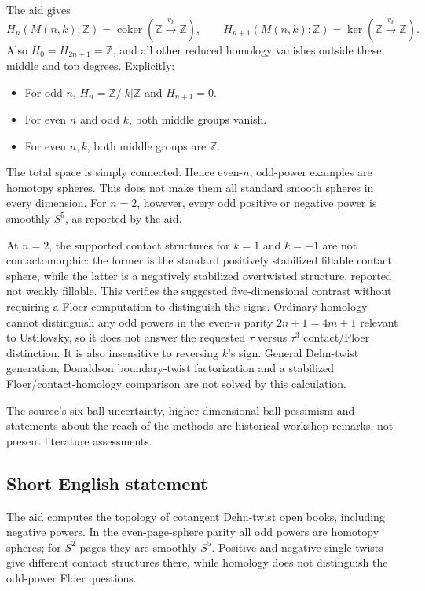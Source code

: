 \documentclass[11pt]{article}
\newcommand{\Z}{\mathbb{Z}}
\begin{document}
The aid gives
\[
 H_n(M(n,k);\Z)=\operatorname{coker}(\Z\xrightarrow{v_k}\Z),
 \qquad
 H_{n+1}(M(n,k);\Z)=\ker(\Z\xrightarrow{v_k}\Z).
\]
Also \(H_0=H_{2n+1}=\Z\), and all other reduced homology vanishes outside these middle and top degrees. Explicitly:
\begin{itemize}
\item For odd \(n\), \(H_n=\Z/|k|\Z\) and \(H_{n+1}=0\).
\item For even \(n\) and odd \(k\), both middle groups vanish.
\item For even \(n,k\), both middle groups are \(\Z\).
\end{itemize}
The total space is simply connected. Hence even-\(n\), odd-power examples are homotopy spheres. This does not make them all standard smooth spheres in every dimension. For \(n=2\), however, every odd positive or negative power is smoothly \(S^5\), as reported by the aid.

At \(n=2\), the supported contact structures for \(k=1\) and \(k=-1\) are not contactomorphic: the former is the standard positively stabilized fillable contact sphere, while the latter is a negatively stabilized overtwisted structure, reported not weakly fillable. This verifies the suggested five-dimensional contrast without requiring a Floer computation to distinguish the signs. Ordinary homology cannot distinguish any odd powers in the even-\(n\) parity \(2n+1=4m+1\) relevant to Ustilovsky, so it does not answer the requested \(\tau\) versus \(\tau^3\) contact/Floer distinction. It is also insensitive to reversing \(k\)'s sign. General Dehn-twist generation, Donaldson boundary-twist factorization and a stabilized Floer/contact-homology comparison are not solved by this calculation.

The source's six-ball uncertainty, higher-dimensional-ball pessimism and statements about the reach of the methods are historical workshop remarks, not present literature assessments.
\subsection{Short English statement}
The aid computes the topology of cotangent Dehn-twist open books, including negative powers. In the even-page-sphere parity all odd powers are homotopy spheres; for \(S^2\) pages they are smoothly \(S^5\). Positive and negative single twists give different contact structures there, while homology does not distinguish the odd-power Floer questions.
\end{document}

